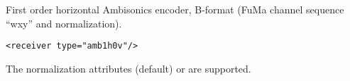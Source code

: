 First order horizontal Ambisonics encoder, B-format (FuMa channel
sequence ``wxy'' and normalization).

\begin{lstlisting}[numbers=none]
<receiver type="amb1h0v"/>
\end{lstlisting}

The normalization attributes  (default) or
 are supported.

